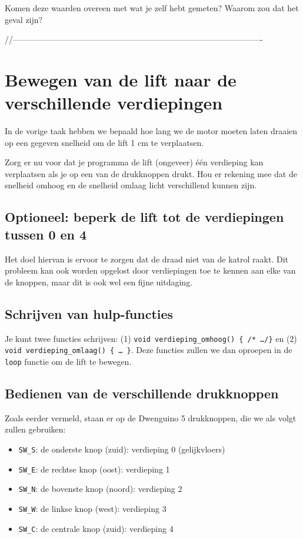 \documentclass[a4paper, 10pt]{article}
\begin{document}
Komen deze waarden overeen met wat je zelf hebt gemeten? Waarom zou dat het geval zijn?


//-------------------------------------------------------------------------------------------
\section{Bewegen van de lift naar de verschillende verdiepingen}

In de vorige taak hebben we bepaald hoe lang we de motor moeten laten draaien op een gegeven snelheid om de lift 1 cm te
verplaatsen.

Zorg er nu voor dat je programma de lift (ongeveer) \'e\'en verdieping kan verplaatsen als je op een van de
drukknoppen drukt. Hou er rekening mee dat de snelheid omhoog en de snelheid omlaag licht verschillend kunnen zijn.

\subsection{Optioneel: beperk de lift tot de verdiepingen tussen 0 en 4}

Het doel hiervan is ervoor te zorgen dat de draad niet van de katrol raakt. Dit probleem kan ook worden
opgelost door verdiepingen toe te kennen aan elke van de knoppen, maar dit is ook wel een fijne uitdaging.


\subsection{Schrijven van hulp-functies}

Je kunt twee functies schrijven: (1) \texttt{void verdieping\_omhoog() \{ /*
\ldots */\}} en (2) \texttt{void verdieping\_omlaag() \{ \* \ldots *\ \}}. Deze
functies zullen we dan oproepen in de \texttt{loop} functie om de lift te bewegen.

\subsection{Bedienen van de verschillende drukknoppen}

Zoals eerder vermeld, staan er op de Dwenguino 5 drukknoppen, die we als volgt zullen gebruiken:

\begin{itemize}
        \item \texttt{SW\_S}: de onderste knop (zuid): verdieping 0 (gelijkvloers)
        \item \texttt{SW\_E}: de rechtse knop (oost): verdieping 1
        \item \texttt{SW\_N}: de bovenste knop (noord): verdieping 2
        \item \texttt{SW\_W}: de linkse knop (west): verdieping 3
        \item \texttt{SW\_C}: de centrale knop (zuid): verdieping 4
\end{itemize}
\end{document}
